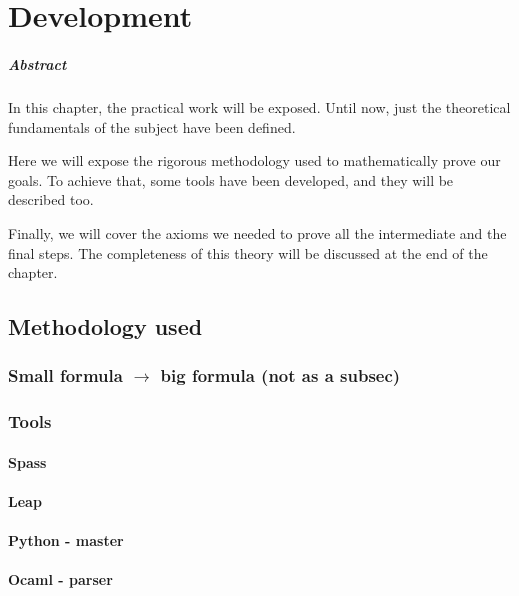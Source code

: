 \chapter{Development\label{sec:develpment}}

\paragraph{Abstract} In this chapter, the practical work will be exposed. Until now, just the theoretical fundamentals of the subject have been defined.

Here we will expose the rigorous methodology used to mathematically prove our goals. To achieve that, some tools have been developed, and they will be described too.

Finally, we will cover the axioms we needed to prove all the intermediate and the final steps. The completeness of this theory will be discussed at the end of the chapter. 

\section{Methodology used}


\subsection{Small formula $\rightarrow$ big formula (not as a subsec)}

\subsection{Tools}

\subsubsection{Spass}

\subsubsection{Leap}

\subsubsection{Python - master}

\subsubsection{Ocaml - parser}


